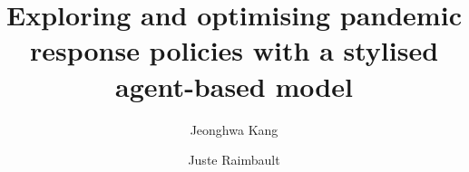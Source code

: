 \documentclass[smallextended]{svjour3}       %
\begin{document}
\title{Exploring and optimising pandemic response policies with a stylised agent-based model}


\author{Jeonghwa Kang          \and
        Juste Raimbault
}





\maketitle

\begin{abstract}
\end{abstract}
\end{document}
